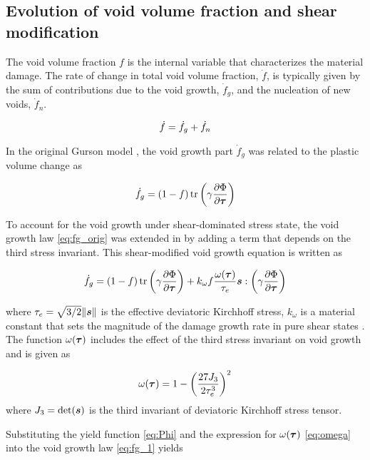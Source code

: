 \documentclass[11pt]{article}
\theoremstyle{remark}
\begin{document}
\subsection{Evolution of void volume fraction and shear modification}
The void volume fraction $f$ is the internal variable that
characterizes the material damage. The rate of change in total void
volume fraction, $\dot{f}$, is typically given by the sum of
contributions due to the void growth, $\dot{f}_g$, and the nucleation
of new voids, $\dot{f}_{n}$.

\begin{equation}\label{eq:dotf}
\dot{f} = \dot{f}_g + \dot{f}_{n}\\
\end{equation}

In the original Gurson model \cite{Gurson1977}, the void growth part
$\dot{f}_g$ was related to the plastic volume change as

\begin{equation}\label{eq:fg_orig}
\dot{f}_g = (1-f)\operatorname{\text{tr}}\left( \gamma\frac{\partial\Phi}{\partial{\boldsymbol{\tau}}}
\right)
\end{equation}

To account for the void growth under shear-dominated stress state, 
the void growth law \eqref{eq:fg_orig} was extended in
\cite{Nahshon2008} by adding a term that depends on the third stress 
invariant. This shear-modified void growth equation is written as

\begin{equation}\label{eq:fg_1}
\dot{f}_g = (1-f)\operatorname{\text{tr}}\left( \gamma\frac{\partial\Phi}{\partial{\boldsymbol{\tau}}}
\right) + k_{\omega}f\frac{\omega({\boldsymbol{\tau}})}{\tau_e}{\boldsymbol{s}}: \left(
\gamma\frac{\partial\Phi}{\partial{\boldsymbol{\tau}}} \right)
\end{equation}

where $\tau_e=\sqrt{3/2}\|{\boldsymbol{s}}\|$ is the effective deviatoric 
Kirchhoff stress, $k_{\omega}$ is a material constant that sets the 
magnitude of the damage growth rate in pure shear states 
\cite{Nahshon2008}. The function $\omega({\boldsymbol{\tau}})$ includes the effect 
of the third stress invariant on void growth and is given as

\begin{equation}\label{eq:omega}
\omega({\boldsymbol{\tau}}) = 1- \left(\frac{27J_3}{2\tau_e^3}\right)^2
\end{equation}
where $J_3=\det({\boldsymbol{s}})$ is the third invariant of deviatoric Kirchhoff
stress tensor.

Substituting the yield function \eqref{eq:Phi} and the expression for
$\omega({\boldsymbol{\tau}})$ \eqref{eq:omega} into the void growth law
\eqref{eq:fg_1} yields
\end{document}
